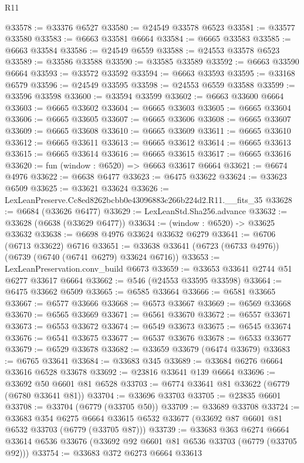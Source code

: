 \begin{lexlean}{R11}
\begin{coremodule}
@33578 := @33376 @6527
@33580 := @24549 @33578 @6523
@33581 := @33577 @33580
@33583 := @6663 @33581 @6664
@33584 := @6665 @33583
@33585 := @6663 @33584
@33586 := @24549 @6559
@33588 := @24553 @33578 @6523
@33589 := @33586 @33588
@33590 := @33585 @33589
@33592 := @6663 @33590 @6664
@33593 := @33572 @33592
@33594 := @6663 @33593
@33595 := @33168 @6579
@33596 := @24549 @33595
@33598 := @24553 @6559 @33588
@33599 := @33596 @33598
@33600 := @33594 @33599
@33602 := @6663 @33600 @6664
@33603 := @6665 @33602
@33604 := @6665 @33603
@33605 := @6665 @33604
@33606 := @6665 @33605
@33607 := @6665 @33606
@33608 := @6665 @33607
@33609 := @6665 @33608
@33610 := @6665 @33609
@33611 := @6665 @33610
@33612 := @6665 @33611
@33613 := @6665 @33612
@33614 := @6665 @33613
@33615 := @6665 @33614
@33616 := @6665 @33615
@33617 := @6665 @33616
@33620 := fun (window : @6520) => @6663 @33617 @6664
@33621 := @6674 @4976
@33622 := @6638 @6477
@33623 := @6475 @33622
@33624 := @33623 @6509
@33625 := @33621 @33624
@33626 := LexLeanPreserve.Cc8ed8262bcbb0e43096883c266b224d2.R11.__fits_35
@33628 := @6684 (@33626 @6477)
@33629 := LexLeanStd.Sha256.advance
@33632 := @33628 (@6638 (@33629 @6477))
@33634 := (window : @6520) -> @33625 @33632
@33638 := @6698 @4976 @33624 @33632 @6279
@33641 := @6706 (@6713 @33622) @6716
@33651 := @33638 @33641 (@6723 (@6733 @4976)) (@6739 (@6740 (@6741 @6279) @33624 @6716))
@33653 := LexLeanPreservation.conv_build @6673
@33659 := @33653 @33641 @2744 @51 @6277 @33617 @6664
@33662 := @546 (@24553 @33595 @33598)
@33664 := @6475 @33662 @6509
@33665 := @6585 @33664
@33666 := @6581 @33665
@33667 := @6577 @33666
@33668 := @6573 @33667
@33669 := @6569 @33668
@33670 := @6565 @33669
@33671 := @6561 @33670
@33672 := @6557 @33671
@33673 := @6553 @33672
@33674 := @6549 @33673
@33675 := @6545 @33674
@33676 := @6541 @33675
@33677 := @6537 @33676
@33678 := @6533 @33677
@33679 := @6529 @33678
@33682 := @33659 @33679 (@6474 @33679)
@33683 := @6765 @33641
@33684 := @33683 @345
@33689 := @33684 @6276 @6664 @33616 @6528 @33678
@33692 := @23816 @33641 @139 @6664
@33696 := @33692 @50 @6601 @81 @6528
@33703 := @6774 @33641 @81 @33622 (@6779 (@6780 @33641 @81))
@33704 := @33696 @33703
@33705 := @23835 @6601
@33708 := @33704 (@6779 (@33705 @50))
@33709 := @33689 @33708
@33724 := @33683
    @354
    @6275
    @6664
    @33615
    @6532
    @33677
    (@33692 @87 @6601 @81 @6532 @33703 (@6779 (@33705 @87)))
@33739 := @33683
    @363
    @6274
    @6664
    @33614
    @6536
    @33676
    (@33692 @92 @6601 @81 @6536 @33703 (@6779 (@33705 @92)))
@33754 := @33683
    @372
    @6273
    @6664
    @33613

\end{coremodule}
\end{lexlean}
